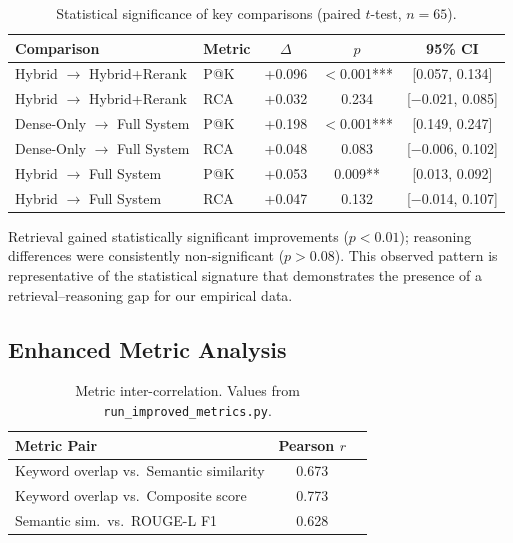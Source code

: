 \documentclass[11pt,a4paper]{article}
\begin{document}
\begin{table}[h]
\centering
\small
\caption{Statistical significance of key comparisons (paired $t$-test, $n{=}65$).}
\label{tab:significance}
\begin{tabular}{llccc}
\toprule
\textbf{Comparison} & \textbf{Metric} & \textbf{$\Delta$} & \textbf{$p$} & \textbf{95\% CI} \\
\midrule
Hybrid $\to$ Hybrid+Rerank & P@K & +0.096 & $<$0.001*** & [0.057, 0.134] \\
Hybrid $\to$ Hybrid+Rerank & RCA & +0.032 & 0.234 & [$-$0.021, 0.085] \\
\addlinespace
Dense-Only $\to$ Full System & P@K & +0.198 & $<$0.001*** & [0.149, 0.247] \\
Dense-Only $\to$ Full System & RCA & +0.048 & 0.083 & [$-$0.006, 0.102] \\
\addlinespace
Hybrid $\to$ Full System & P@K & +0.053 & 0.009** & [0.013, 0.092] \\
Hybrid $\to$ Full System & RCA & +0.047 & 0.132 & [$-$0.014, 0.107] \\
\bottomrule
\end{tabular}
\end{table}

Retrieval gained statistically significant improvements
($p{<}0.01$); reasoning differences were consistently
non-significant ($p{>}0.08$).
This observed pattern is representative of the statistical signature
that demonstrates the presence of a retrieval--reasoning gap for our
empirical data.

\subsection{Enhanced Metric Analysis}
\label{sec:metrics-result}

\begin{table}[h]
\centering
\small
\caption{Metric inter-correlation.
Values from \texttt{run\_improved\_metrics.py}.}
\label{tab:metric-corr}
\begin{tabular}{lcc}
\toprule
\textbf{Metric Pair} & \textbf{Pearson $r$} \\
\midrule
Keyword overlap vs.\ Semantic similarity      & 0.673 \\
Keyword overlap vs.\ Composite score          & 0.773 \\
Semantic sim.\ vs.\ ROUGE-L F1                & 0.628 \\
\bottomrule
\end{tabular}
\end{table}
\end{document}
